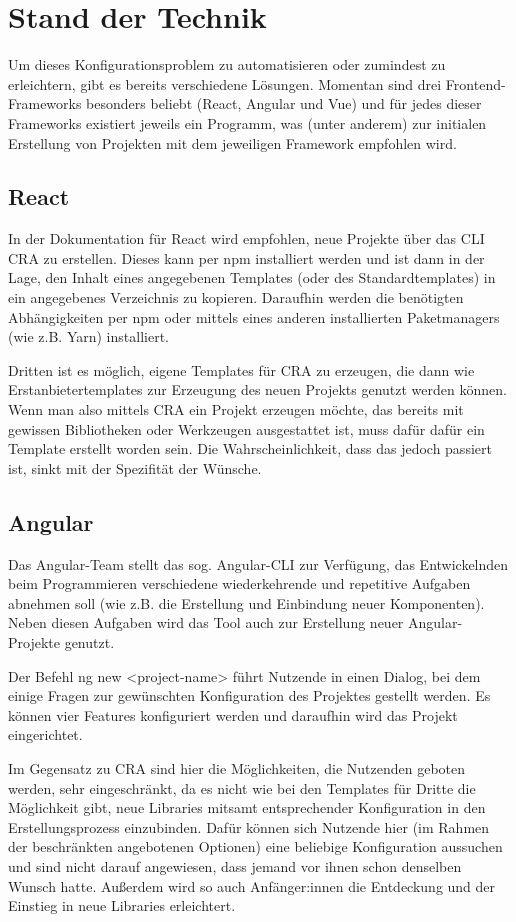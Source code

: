 \section{Stand der Technik}
Um dieses Konfigurationsproblem zu automatisieren oder zumindest zu erleichtern, gibt es bereits verschiedene Lösungen. Momentan sind drei Frontend-Frameworks besonders beliebt (React, Angular und Vue) \cite{stateofjs:fe_framework_usage} und für jedes dieser Frameworks existiert jeweils ein Programm, was (unter anderem) zur initialen Erstellung von Projekten mit dem jeweiligen Framework empfohlen wird.

\subsection{React}
In der Dokumentation für React wird empfohlen, neue Projekte über das \gls{CLI} \gls{CRA} zu erstellen. Dieses kann per \gls{npm} installiert werden und ist dann in der Lage, den Inhalt eines angegebenen Templates (oder des Standardtemplates) in ein angegebenes Verzeichnis zu kopieren. Daraufhin werden die benötigten Abhängigkeiten per \gls{npm} oder mittels eines anderen installierten Paketmanagers (wie z.B. Yarn) installiert.

Dritten ist es möglich, eigene Templates für \gls{CRA} zu erzeugen, die dann wie Erstanbietertemplates zur Erzeugung des neuen Projekts genutzt werden können. Wenn man also mittels \gls{CRA} ein Projekt erzeugen möchte, das bereits mit gewissen Bibliotheken oder Werkzeugen ausgestattet ist, muss dafür dafür ein Template erstellt worden sein. Die Wahrscheinlichkeit, dass das jedoch passiert ist, sinkt mit der Spezifität der Wünsche.

\subsection{Angular}
Das Angular-Team stellt das sog. Angular-CLI zur Verfügung, das Entwickelnden beim Programmieren verschiedene wiederkehrende und repetitive Aufgaben abnehmen soll (wie z.B. die Erstellung und Einbindung neuer Komponenten). Neben diesen Aufgaben wird das Tool auch zur Erstellung neuer Angular-Projekte genutzt.

Der Befehl ng new <project-name> führt Nutzende in einen Dialog, bei dem einige Fragen zur gewünschten Konfiguration des Projektes gestellt werden. Es können vier Features konfiguriert werden und daraufhin wird das Projekt eingerichtet.

Im Gegensatz zu CRA sind hier die Möglichkeiten, die Nutzenden geboten werden, sehr eingeschränkt, da es nicht wie bei den Templates für Dritte die Möglichkeit gibt, neue Libraries mitsamt entsprechender Konfiguration in den Erstellungsprozess einzubinden. Dafür können sich Nutzende hier (im Rahmen der beschränkten angebotenen Optionen) eine beliebige Konfiguration aussuchen und sind nicht darauf angewiesen, dass jemand vor ihnen schon denselben Wunsch hatte. Außerdem wird so auch Anfänger:innen die Entdeckung und der Einstieg in neue Libraries erleichtert.


